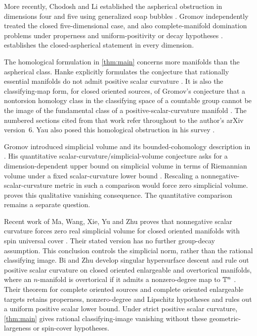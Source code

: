 More recently, Chodosh and Li established the aspherical obstruction in
dimensions four and five using generalized soap bubbles
\cite{ChodoshLi2024}. Gromov independently treated the closed
five-dimensional case, and also complete-manifold domination problems under
properness and uniform-positivity or decay hypotheses
\cite{GromovAsphericalFive2020}.
 establishes the closed-aspherical statement in every
dimension.

The homological formulation in \cref{thm:main} concerns more manifolds than
the aspherical class. Hanke explicitly formulates the conjecture that
rationally essential manifolds do not admit positive scalar curvature
\cite[Definition~2.8 and Conjecture~2.9]{Hanke2011}. It is also the
classifying-map form, for closed oriented sources, of Gromov's conjecture
that a nontorsion homology class in the classifying space of a countable group
cannot be the image of the fundamental class of a positive-scalar-curvature manifold
\cite[Section~1.5, \(\lbrack\mathrm{Sc}\not>0\rbrack\), p.~19]{Gromov2023}.
The numbered sections cited from that work refer throughout to the author's
arXiv version~6. Yau also posed this homological obstruction in his survey
\cite[p.~265]{Yau2000}.

Gromov introduced simplicial volume and its bounded-cohomology description
in \cite{Gromov1982}. His quantitative scalar-curvature/simplicial-volume
conjecture asks for a dimension-dependent upper bound on simplicial volume in
terms of Riemannian volume under a fixed scalar-curvature lower bound
\cite[Section~3.13]{Gromov2023}. Rescaling a nonnegative-scalar-curvature
metric in such a comparison would force zero simplicial volume.
 proves this qualitative vanishing consequence.
The quantitative comparison remains a separate question.

Recent work of Ma, Wang, Xie, Yu and Zhu proves that nonnegative scalar
curvature forces zero real simplicial volume for closed oriented manifolds
with spin universal cover \cite[Corollary~1.2]{MaWangXieYuZhu2026}. Their
stated version has no further group-decay assumption. This conclusion
controls the simplicial norm, rather than the rational classifying image.
Bi and Zhu develop singular hypersurface descent and rule out positive scalar
curvature on closed oriented enlargeable and overtorical manifolds, where an
$n$-manifold is overtorical if it admits a nonzero-degree map to $\mathbb T^n$
\cite[Theorems~A and~B]{BiZhu2026}. Their theorem for complete oriented
sources and complete oriented enlargeable targets retains properness,
nonzero-degree and Lipschitz hypotheses and rules out a uniform positive
scalar lower bound.
Under strict positive scalar curvature,
\cref{thm:main} gives rational classifying-image vanishing without these
geometric-largeness or spin-cover hypotheses.

